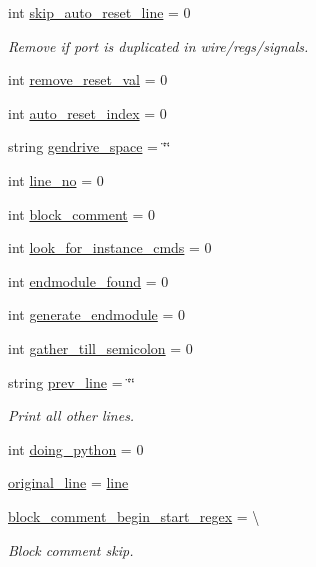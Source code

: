 \begin{DoxyCompactItemize}
int \hyperlink{namespaceveripy_acebf2b0050dc39a37718a8ef927abc7c}{skip\-\_\-auto\-\_\-reset\-\_\-line} = 0
\begin{DoxyCompactList}\small\item\em Remove if port is duplicated in wire/regs/signals. \end{DoxyCompactList}\item 
int \hyperlink{namespaceveripy_ab3ef77cc1c1bb3b758841e9926029532}{remove\-\_\-reset\-\_\-val} = 0
\item 
int \hyperlink{namespaceveripy_a796e24d0f42e97113536ef5675583aa3}{auto\-\_\-reset\-\_\-index} = 0
\item 
string \hyperlink{namespaceveripy_af6d3a3b592e0e9621179105b392ab262}{gendrive\-\_\-space} = \char`\"{}\char`\"{}
\item 
int \hyperlink{namespaceveripy_a3a1edb61e3fbeca505c17ea042672337}{line\-\_\-no} = 0
\item 
int \hyperlink{namespaceveripy_a62ad587d407c4f9be0fe319a908afcc9}{block\-\_\-comment} = 0
\item 
int \hyperlink{namespaceveripy_a9592e23a9639a28b61167a30ba6930c3}{look\-\_\-for\-\_\-instance\-\_\-cmds} = 0
\item 
int \hyperlink{namespaceveripy_a3ba39ef01b3512b93ff8c35da72555c3}{endmodule\-\_\-found} = 0
\item 
int \hyperlink{namespaceveripy_aa38fc4edf33670a01086cbc8d7aca1f8}{generate\-\_\-endmodule} = 0
\item 
int \hyperlink{namespaceveripy_a90f28d0208574d62b946c16a42d85318}{gather\-\_\-till\-\_\-semicolon} = 0
\item 
string \hyperlink{namespaceveripy_a716a6e8cf97f3b8c4bc93680674397cd}{prev\-\_\-line} = \char`\"{}\char`\"{}
\begin{DoxyCompactList}\small\item\em Print all other lines. \end{DoxyCompactList}\item 
int \hyperlink{namespaceveripy_aacb0f311e69b18de8f0222b583ca9d33}{doing\-\_\-python} = 0
\item 
\hyperlink{namespaceveripy_ab15a6bb1f76d3b0db1c63066479489eb}{original\-\_\-line} = \hyperlink{namespaceveripy_a3cf9cf94513841f0d65d3081b08a55cc}{line}
\item 
\hyperlink{namespaceveripy_abcadaeae6f3a929e198c9d9255100a7d}{block\-\_\-comment\-\_\-begin\-\_\-start\-\_\-regex} = \textbackslash{}
\begin{DoxyCompactList}\small\item\em Block comment skip. \end{DoxyCompactList}\item 

\end{DoxyCompactItemize}
